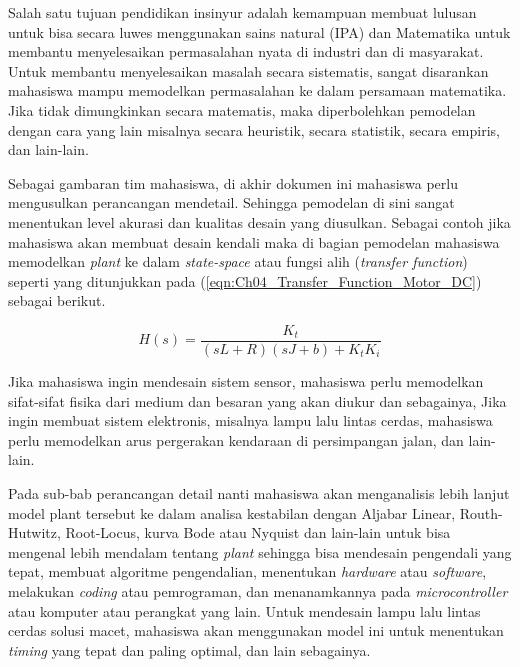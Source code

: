 Salah satu tujuan pendidikan insinyur adalah kemampuan membuat lulusan untuk bisa secara luwes menggunakan sains natural (IPA) dan Matematika untuk membantu menyelesaikan permasalahan nyata di industri dan di masyarakat. 
Untuk membantu menyelesaikan masalah secara sistematis, sangat disarankan mahasiswa mampu memodelkan permasalahan ke dalam persamaan matematika. Jika tidak dimungkinkan secara matematis, maka diperbolehkan pemodelan dengan cara yang lain misalnya secara heuristik, secara statistik, secara empiris, dan lain-lain.

Sebagai gambaran tim mahasiswa, di akhir dokumen ini mahasiswa perlu mengusulkan perancangan mendetail. Sehingga pemodelan di sini sangat menentukan level akurasi dan kualitas desain yang diusulkan. Sebagai contoh jika mahasiswa akan membuat desain kendali maka di bagian pemodelan mahasiswa memodelkan \textit{plant} ke dalam \textit{state-space} atau fungsi alih (\textit{transfer function}) seperti yang ditunjukkan pada (\ref{eqn:Ch04_Transfer_Function_Motor_DC}) sebagai berikut.

\begin{equation}
    \label{eqn:Ch04_Transfer_Function_Motor_DC}
    H(s) = \dfrac{K_t}{\left( sL + R \right) \left( sJ + b \right) + K_t K_i}
\end{equation}

Jika mahasiswa ingin mendesain sistem sensor, mahasiswa perlu memodelkan sifat-sifat fisika dari medium dan besaran yang akan diukur dan sebagainya, Jika ingin membuat sistem elektronis, misalnya lampu lalu lintas cerdas, mahasiswa perlu memodelkan arus pergerakan kendaraan di persimpangan jalan, dan lain-lain.

Pada sub-bab perancangan detail nanti mahasiswa akan menganalisis lebih lanjut model plant tersebut ke dalam analisa kestabilan dengan Aljabar Linear, Routh-Hutwitz, Root-Locus, kurva Bode atau Nyquist dan lain-lain untuk bisa mengenal lebih mendalam tentang \textit{plant} sehingga bisa mendesain pengendali yang tepat, membuat algoritme pengendalian, menentukan \textit{hardware} atau \textit{software}, melakukan \textit{coding} atau pemrograman, dan menanamkannya pada \textit{microcontroller} atau komputer atau perangkat yang lain. Untuk mendesain lampu lalu lintas cerdas solusi macet, mahasiswa akan menggunakan model ini untuk menentukan \textit{timing} yang tepat dan paling optimal, dan lain sebagainya. 

